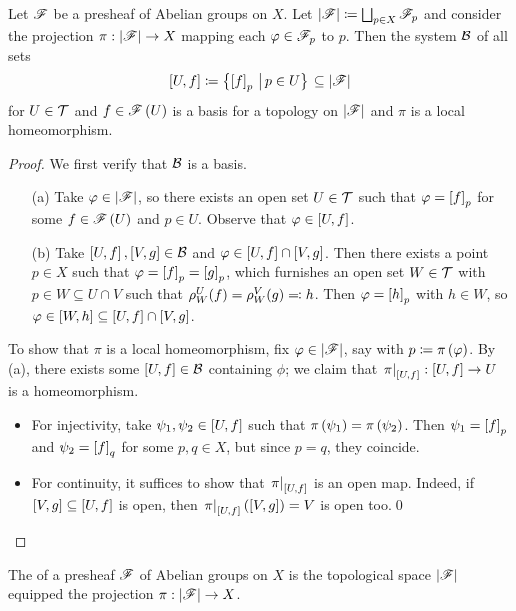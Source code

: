 \documentclass[../Moduli_Spaces_of_Riemann_Surfaces.tex]{subfiles}
\begin{document}
    \begin{proposition}\label{2.2:prp:basis_stalk}
        Let $\mathscr{F}$ be a presheaf of Abelian groups on $X$. Let $\left|\mathscr{F}\right|\coloneqq\bigsqcup_{p\in X}\mathscr{F}_p$ and consider the projection $\pi:\left|\mathscr{F}\right|\to X$ mapping each $\varphi\in\mathscr{F}_p$ to $p$. Then the system $\mathcal{B}$ of all sets
        \begin{equation*}
            \left[U,f\right]\coloneqq\bigl\{\left[f\right]_p\,\left|\,p\in U\bigr\}\right.\subseteq\left|\mathscr{F}\right|
        \end{equation*}
        for $U\in\mathcal{T}$ and $f\in\mathscr{F}\left(U\right)$ is a basis for a topology on $\left|\mathscr{F}\right|$ and $\pi$ is a local homeomorphism.
    \end{proposition}
    \begin{proof}
        We first verify that $\mathcal{B}$ is a basis.
        \begin{enumerate}
            \item[(a)] Take $\varphi\in\left|\mathscr{F}\right|$, so there exists an open set $U\in\mathcal{T}$ such that $\varphi=\left[f\right]_p$ for some $f\in\mathscr{F}\left(U\right)$ and $p\in U$. Observe that $\varphi\in\left[U,f\right]$.
            \item[(b)] Take $\left[U,f\right],\left[V,g\right]\in\mathcal{B}$ and $\varphi\in\left[U,f\right]\cap\left[V,g\right]$. Then there exists a point $p\in X$ such that $\varphi=\left[f\right]_p=\left[g\right]_p$, which furnishes an open set $W\in\mathcal{T}$ with $p\in W\subseteq U\cap V$ such that $\rho^U_W\!\left(f\right)=\rho^V_W\!\left(g\right)\eqqcolon h$. Then $\varphi=\left[h\right]_p$ with $h\in W$, so $\varphi\in\left[W,h\right]\subseteq\left[U,f\right]\cap\left[V,g\right]$.
        \end{enumerate}
        To show that $\pi$ is a local homeomorphism, fix $\varphi\in\left|\mathscr{F}\right|$, say with $p\coloneqq\pi\left(\varphi\right)$. By (a), there exists some $\left[U,f\right]\in\mathcal{B}$ containing $\phi$; we claim that $\left.\pi\right|_{\left[U,f\right]}:\left[U,f\right]\to U$ is a homeomorphism.
        \begin{itemize}
            \item For injectivity, take $\psi_1,\psi_2\in\left[U,f\right]$ such that $\pi\left(\psi_1\right)=\pi\left(\psi_2\right)$. Then $\psi_1=\left[f\right]_p$ and $\psi_2=\left[f\right]_q$ for some $p,q\in X$, but since $p=q$, they coincide.
            \item For continuity, it suffices to show that $\left.\pi\right|_{\left[U,f\right]}$ is an open map. Indeed, if $\left[V,g\right]\subseteq\left[U,f\right]$ is open, then $\left.\pi\right|_{\left[U,f\right]}\left(\left[V,g\right]\right)=V$ is open too.\qed
        \end{itemize}
    \end{proof}
    \begin{definition}
        The  of a presheaf $\mathscr{F}$ of Abelian groups on $X$ is the topological space $\left|\mathscr{F}\right|$ equipped the projection $\pi:\left|\mathscr{F}\right|\to X$.
    \end{definition}
\end{document}

